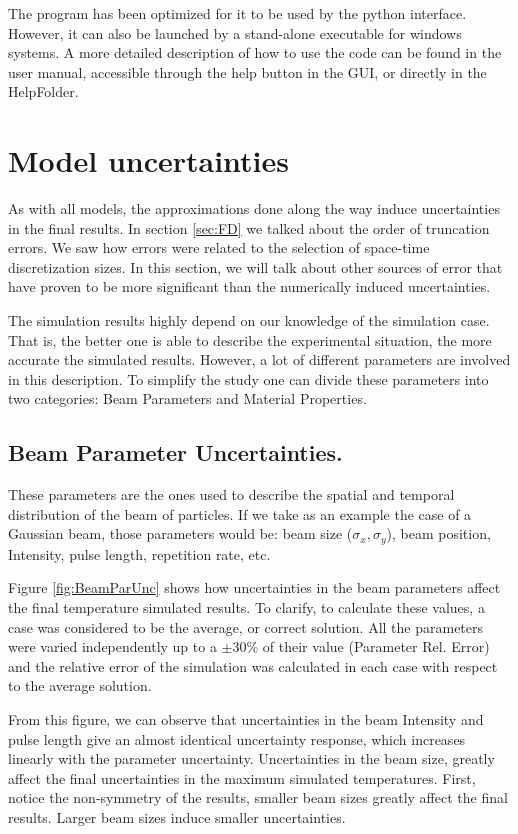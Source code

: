 The program has been optimized for it to be used by the python interface. However, it can also be launched by a stand-alone executable for windows systems. A more detailed description of how to use the code can be found in the user manual, accessible through the help button in the GUI, or directly in the HelpFolder.

\section{Model uncertainties}

As with all models, the approximations done along the way induce uncertainties in the final results. In section \ref{sec:FD} we talked about the order of truncation errors. We saw how errors were related to the selection of space-time discretization sizes. In this section, we will talk about other sources of error that have proven to be more significant than the numerically induced uncertainties. 

The simulation results highly depend on our knowledge of the simulation case. That is, the better one is able to describe the experimental situation, the more accurate the simulated results. However, a lot of different parameters are involved in this description. To simplify the study one can divide these parameters into two categories: Beam Parameters and Material Properties. 

\subsection{Beam Parameter Uncertainties.}

These parameters are the ones used to describe the spatial and temporal distribution of the beam of particles. If we take as an example the case of a Gaussian beam, those parameters would be: beam size ($\sigma_x , \sigma_y$), beam position, Intensity, pulse length, repetition rate, etc. 

Figure \ref{fig:BeamParUnc} shows how uncertainties in the beam parameters affect the final temperature simulated results. To clarify, to calculate these values, a case was considered to be the average, or correct solution. All the parameters were varied independently up to a $\pm 30\%$ of their value (Parameter Rel. Error)  and the relative error of the simulation was calculated in each case with respect to the average solution. 

From this figure, we can observe that uncertainties in the beam Intensity and pulse length give an almost identical uncertainty response, which increases linearly with the parameter uncertainty. Uncertainties in the beam size, greatly affect the final uncertainties in the maximum simulated temperatures. First, notice the non-symmetry of the results, smaller beam sizes greatly affect the final results. Larger beam sizes induce smaller uncertainties. 

